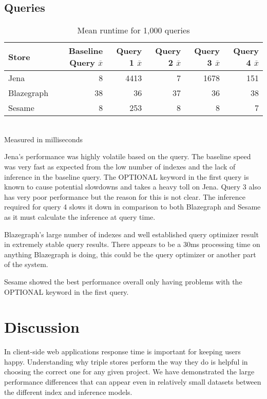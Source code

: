 \documentclass{llncs}
\begin{document}
\subsection{Queries}
\begin{table}
\begin{center}
\caption{Mean runtime for 1,000 queries}
\begin{tabular}{l | r r r r r}
    Store & Baseline Query $\overline{x}$ & Query 1 $\overline{x}$ & Query 2 $\overline{x}$ & Query 3 $\overline{x}$ & Query 4 $\overline{x}$ \\
\hline
Jena & 8 & 4413 & 7 & 1678 & 151 \\
Blazegraph & 38 & 36 & 37 & 36 & 38 \\
Sesame & 8 & 253 & 8 & 8 & 7
\end{tabular}
\\[5pt]
Measured in milliseconds
\end{center}
\end{table}

Jena's performance was highly volatile based on the query.  The baseline speed was very fast as expected from the low number of indexes and the lack of inference in the baseline query.  The OPTIONAL keyword in the first query is known to cause potential slowdowns and takes a heavy toll on Jena.  Query 3 also has very poor performance but the reason for this is not clear.  The inference required for query 4 slows it down in comparison to both Blazegraph and Sesame as it must calculate the inference at query time.

Blazegraph's large number of indexes and well established query optimizer result in extremely stable query results.  There appears to be a 30ms processing time on anything Blazegraph is doing, this could be the query optimizer or another part of the system. 

Sesame showed the best performance overall only having problems with the OPTIONAL keyword in the first query.

\section{Discussion}
In client-side web applications response time is important for keeping users happy.  Understanding why triple stores perform the way they do is helpful in choosing the correct one for any given project.  We have demonstrated the large performance differences that can appear even in relatively small datasets between the different index and inference models.



\end{document}
